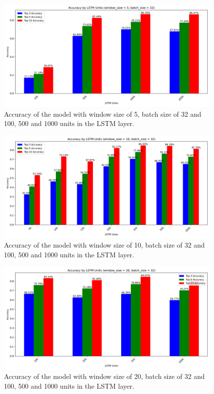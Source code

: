 \begin{figure}[h!]
    \centering
    \includegraphics[scale=0.4]{images/accuracy_by_lstm_units_window_5_batch_32.png}
    \caption{Accuracy of the model with window size of 5, batch size of 32 and 100, 500 and 1000 units in the LSTM layer.}
    \label{fig:window_size5}
\end{figure}

\begin{figure}[h!]
    \centering
    \includegraphics[scale=0.4]{images/accuracy_by_lstm_units_window_10_batch_32.png}
    \caption{Accuracy of the model with window size of 10, batch size of 32 and 100, 500 and 1000 units in the LSTM layer.}
    \label{fig:window_size10}
\end{figure}


\begin{figure}[h!]
    \centering
    \includegraphics[scale=0.4]{images/accuracy_by_lstm_units_window_20_batch_32.png}
    \caption{Accuracy of the model with window size of 20, batch size of 32 and 100, 500 and 1000 units in the LSTM layer.}
    \label{fig:window_size20}
\end{figure}


